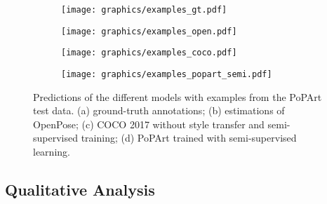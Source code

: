 \documentclass[sigconf]{acmart}
\begin{document}
\begin{figure}
\centering
\begin{subfigure}{.247\linewidth}
  \centering
  \texttt{[image: graphics/examples\_gt.pdf]}
  \caption{}
  \label{fig:examples-gt}
\end{subfigure}\hfill
\begin{subfigure}{.247\linewidth}
  \centering
  \texttt{[image: graphics/examples\_open.pdf]}
  \caption{}
  \label{fig:examples-openpose}
\end{subfigure}\hfill
\begin{subfigure}{.247\linewidth}
  \centering
  \texttt{[image: graphics/examples\_coco.pdf]}
  \caption{}
  \label{fig:examples-coco}
\end{subfigure}\hfill
\begin{subfigure}{.247\linewidth}
  \centering
  \texttt{[image: graphics/examples\_popart\_semi.pdf]}
  \caption{}
  \label{fig:examples-our}
\end{subfigure}\caption{Predictions of the different models with examples from the \ac{PoPArt} test data. (a) ground-truth annotations; (b) estimations of OpenPose; (c) COCO 2017 without style transfer and semi-supervised training; (d) \ac{PoPArt} trained with semi-supervised learning.}
\label{fig:examples}
\end{figure}

\subsection{Qualitative Analysis}
\label{chp:qualitative}
\end{document}
